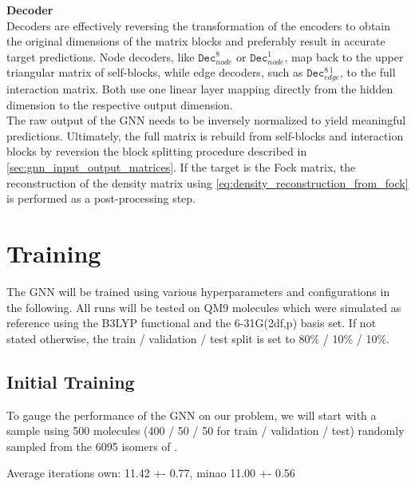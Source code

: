 \textbf{Decoder}\\
Decoders are effectively reversing the transformation of the encoders to obtain the original dimensions of the matrix blocks and preferably result in accurate target predictions. Node decoders, like $\texttt{Dec}^{8}_{node}$ or  $\texttt{Dec}^{1}_{node}$, map back to the upper triangular matrix of self-blocks, while edge decoders, such as $\texttt{Dec}^{8\,1}_{edge}$, to the full interaction matrix. Both use one linear layer mapping directly from the hidden dimension to the respective output dimension. \\

The raw output of the GNN needs to be inversely normalized to yield meaningful predictions. Ultimately, the full matrix is rebuild from self-blocks and interaction blocks by reversion the block splitting procedure described in \autoref{sec:gnn_input_output_matrices}. If the target is the Fock matrix, the reconstruction of the density matrix using \autoref{eq:density_reconstruction_from_fock} is performed as a post-processing step.




\section{Training}
\label{sec:gnn_training}

The GNN will be trained using various hyperparameters and configurations in the following. All runs will be tested on QM9  molecules which were simulated as reference using the B3LYP functional and the 6-31G(2df,p) basis set. If not stated otherwise, the train / validation / test split is set to 80\% / 10\% / 10\%.\\

\subsection{Initial Training}
\label{subsec:gnn_initial_training}
To gauge the performance of the GNN on our problem, we will start with a sample using 500 molecules (400 / 50 / 50 for train / validation / test) randomly sampled from the 6095 isomers of . 

Average iterations own: 11.42 +- 0.77, minao 11.00 +- 0.56

\TODO{}

        
